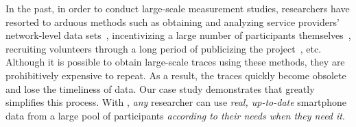In the past, in order to conduct large-scale measurement studies, researchers
have resorted to arduous methods such as obtaining and analyzing service
providers' network-level data sets~\cite{xu:imc:2011, trestian:imc:2009,
trestian:ton:2012}, incentivizing a large number of participants
themselves~\cite{falaki:mobisys:2010}, recruiting volunteers through a long
period of publicizing the project~\cite{shye:micro:2009}, etc. Although it is
possible to obtain large-scale traces using these methods, they are
prohibitively expensive to repeat. As a result, the traces quickly become
obsolete and lose the timeliness of data. Our case study demonstrates
that \PhoneLab{} greatly simplifies this process. With \PhoneLab{}, {\it any}
researcher can use {\it real, up-to-date} smartphone data from a large pool of
participants {\it according to their needs when they need it}.
